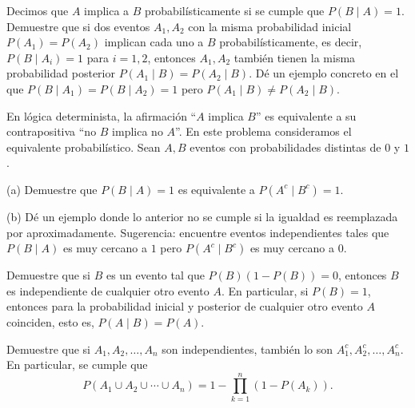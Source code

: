 \documentclass[12pt,a4paper]{article}
\begin{document}
    \begin{mdframed}[style=mdpinkbox,frametitle={Ejercicio 3}]
        Decimos que $A$ implica a $B$ probabilísticamente si se cumple que $P(B \mid A) = 1$. Demuestre
        que si dos eventos $A_1, A_2$ con la misma probabilidad inicial $P(A_1) = P(A_2)$ implican cada uno a $B$
        probabilísticamente, es decir, $P(B \mid A_i) = 1$ para $i = 1, 2$, entonces $A_1, A_2$ también tienen
        la misma probabilidad posterior $P(A_1 \mid B) = P(A_2 \mid B)$. Dé un ejemplo concreto en el que
        $P(B \mid A_1) = P(B \mid A_2) = 1$ pero $P(A_1 \mid B) \neq P(A_2 \mid B)$.
    \end{mdframed}

    \begin{mdframed}[style=mdpinkbox,frametitle={Ejercicio 4}]
        En lógica determinista, la afirmación “$A$ implica $B$” es equivalente a su contrapositiva “no $B$
        implica no $A$”. En este problema consideramos el equivalente probabilístico. Sean $A, B$ eventos
        con probabilidades distintas de $0$ y $1$.

        (a) Demuestre que $P(B \mid A) = 1$ es equivalente a $P(A^c \mid B^c) = 1$.

        (b) Dé un ejemplo donde lo anterior no se cumple si la igualdad es reemplazada por aproximadamente.
        Sugerencia: encuentre eventos independientes tales que $P(B \mid A)$ es muy cercano a $1$ pero
        $P(A^c \mid B^c)$ es muy cercano a $0$.
    \end{mdframed}

    \begin{mdframed}[style=mdpinkbox,frametitle={Ejercicio 5}]
        Demuestre que si $B$ es un evento tal que $P(B)(1 - P(B)) = 0$, entonces $B$ es independiente
        de cualquier otro evento $A$. En particular, si $P(B) = 1$, entonces para la probabilidad inicial
        y posterior de cualquier otro evento $A$ coinciden, esto es, $P(A \mid B) = P(A)$.
    \end{mdframed}

    \begin{mdframed}[style=mdpinkbox,frametitle={Ejercicio 6}]
        Demuestre que si $A_1, A_2, \dots, A_n$ son independientes, también lo son
        $A_1^c, A_2^c, \dots, A_n^c$. En particular, se cumple que
        \[
        P(A_1 \cup A_2 \cup \cdots \cup A_n) = 1 - \prod_{k=1}^{n} (1 - P(A_k)).
        \]
    \end{mdframed}
\end{document}
